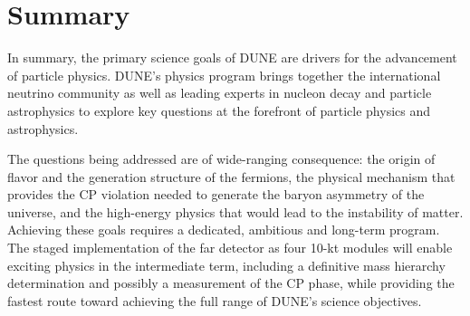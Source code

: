
\section{Summary}

In summary, the primary science goals of DUNE are drivers for the
advancement of particle physics. DUNE's physics program brings together the 
international neutrino community as well as leading experts in nucleon decay
and particle astrophysics to explore key questions at the forefront of
particle physics and astrophysics.

The questions being addressed are of wide-ranging consequence: the origin of flavor and the generation
structure of the fermions, the physical mechanism that provides the CP
violation needed to generate the baryon asymmetry of the universe, 
and the high-energy physics that would lead to the instability
of matter.  Achieving these goals requires a dedicated, ambitious and
long-term program.  
The staged implementation of
the far detector as four 10-kt modules will enable
exciting physics in the intermediate term, including a definitive mass
hierarchy determination and possibly a measurement of the CP phase, 
while providing the fastest route toward achieving the
full range of DUNE's science objectives.  




